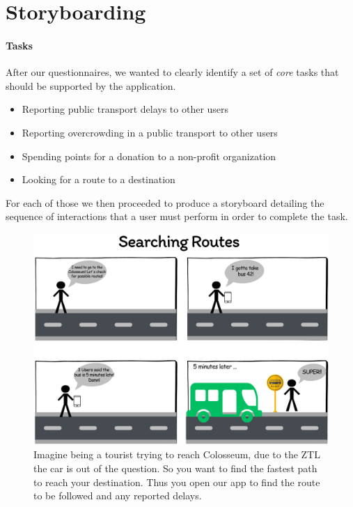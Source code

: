 \documentclass[a4paper, 11pt]{report}
\newenvironment{titlebox}[1][]{%
  \centering
  \basecolorbox[#1]%
}{%
  \endbasecolorbox%
}
\begin{document}
\section{Storyboarding}\label{sec:storyboarding}

\paragraph{Tasks}

After our questionnaires, we wanted to clearly identify a set of \emph{core} tasks that should be
supported by the application.

\begin{titlebox}[The Tasks:]
	\begin{itemize}\label{list:tasks}
		\item Reporting public transport delays to other users
		\item Reporting overcrowding in a public transport to other users
		\item Spending points for a donation to a non-profit organization
		\item Looking for a route to a destination
	\end{itemize}
\end{titlebox}


For each of those we then proceeded to produce a storyboard detailing the sequence of
interactions that a user must perform in order to complete the task.


\begin{figure}[H]
	\centering
	\includegraphics[width=.5\textwidth]{img/storyboards/storyboard_searching_routes.png}
	\caption{Imagine being a tourist trying to reach Colosseum,
		due to the ZTL the car is out of the question. So you want to find the fastest
		path to reach your destination. Thus you open our app to find the route to be followed and any reported delays.}\label{fig:a}
\end{figure}
\end{document}

